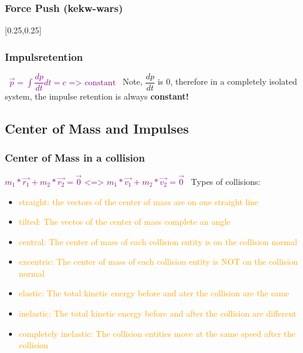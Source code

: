 \documentclass[main.tex,fontsize=8pt,paper=a4,paper=portrait,DIV=calc,]{scrartcl}
\begin{document}
\begin{multicols*}{2}
\subsubsection{Force Push (kekw-wars)}
[0.25,0.25]

\subsubsection{Impulsretention}
\, \newline
\large \textcolor{purple}{ \( \vec{p} = \int \dfrac{dp}{dt} dt = c \text{ => constant}\)}\newline
\Large \, \newline
Note, \(\dfrac{dp}{dt}\) is 0, therefore in a completely isolated system, the impulse retention is always \textbf{constant!} \normalsize \newline


\subsection{Center of Mass and Impulses} 
\subsubsection{Center of Mass in a collision}
\vspace{2mm}
\large \textcolor{purple}{\( m_1 * \vec{r_1} + m_2 * \vec{r_2} = \vec{0} \text{ <=> } m_1*\vec{v_1} + m_2 * \vec{v_2} = \vec{0} \)}\newline
\normalsize \, \newline
Types of collisions:\newline
\begin{itemize}
\item \textcolor{orange}{straight: the vectors of the center of mass are on one straight line}
\item \textcolor{orange}{tilted: The vectos of the center of mass complete an angle}
\item \textcolor{orange}{central: The center of mass of each collision entity is on the collision normal}
\item \textcolor{orange}{excentric: The center of mass of each collision entity is NOT on the collision normal }
\item \textcolor{orange}{elastic: The total kinetic energy before and ater the collision are the same}
\item \textcolor{orange}{inelastic: The total kinetic energy before and after the collision are different}
\item \textcolor{orange}{completely inelastic: The collision entities move at the same speed after the collision}
\end{itemize} 


\end{multicols*}
\end{document}
